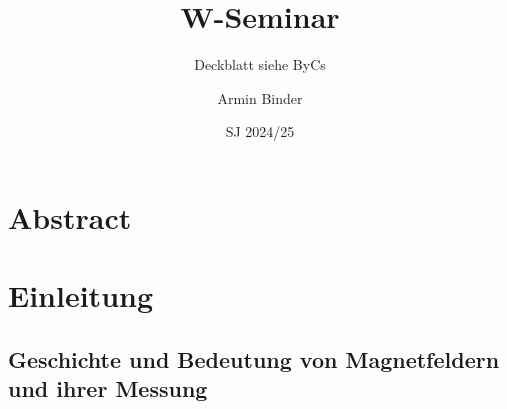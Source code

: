 \documentclass[12pt, a4paper]{article}
\title{W-Seminar}
\subtitle{Deckblatt siehe ByCs}
\author{Armin Binder }
\date{SJ 2024/25}
\begin{document}
	\pagestyle{fancy}
	\fancyhf{} 
	\fancyfoot[C]{\thepage}
	
	\maketitle
	\thispagestyle{empty}
	\pagebreak
	
	\tableofcontents
	\thispagestyle{empty}
	\pagebreak
	
	\section{Abstract}
	
	
	\section{Einleitung}
	\subsection{Geschichte und Bedeutung von Magnetfeldern und ihrer Messung}
	
\end{document}
